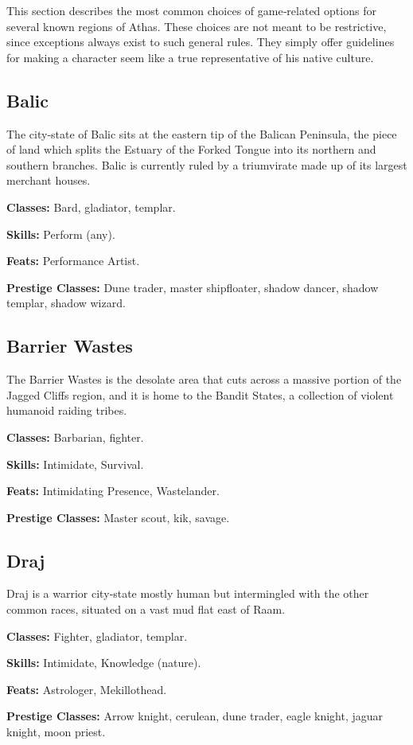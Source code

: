 \documentclass[10pt,a4paper,twocolumn]{d20}
\begin{document}
{This section describes the most common choices of game‐related options for several known regions of Athas. These choices are not meant to be restrictive, since exceptions always exist to such general rules. They simply offer guidelines for making a character seem like a true representative of his native culture.

\subsection{Balic}
The city‐state of Balic sits at the eastern tip of the Balican Peninsula, the piece of land which splits the Estuary of the Forked Tongue into its northern and southern branches. Balic is currently ruled by a triumvirate made up of its largest merchant houses.

\textbf{Classes:} Bard, gladiator, templar.

\textbf{Skills:} Perform (any).

\textbf{Feats:} Performance Artist.

\textbf{Prestige Classes:} Dune trader, master shipfloater, shadow dancer, shadow templar, shadow wizard.

\subsection{Barrier Wastes}
The Barrier Wastes is the desolate area that cuts across a massive portion of the Jagged Cliffs region, and it is home to the Bandit States, a collection of violent humanoid raiding tribes.

\textbf{Classes:} Barbarian, fighter.

\textbf{Skills:} Intimidate, Survival.

\textbf{Feats:} Intimidating Presence, Wastelander.

\textbf{Prestige Classes:} Master scout, kik, savage.

\subsection{Draj}
Draj is a warrior city‐state mostly human but intermingled with the other common races, situated on a vast mud flat east of Raam.

\textbf{Classes:} Fighter, gladiator, templar.

\textbf{Skills:} Intimidate, Knowledge (nature).

\textbf{Feats:} Astrologer, Mekillothead.

\textbf{Prestige Classes:} Arrow knight, cerulean, dune trader, eagle knight, jaguar knight, moon priest.

}
\end{document}
